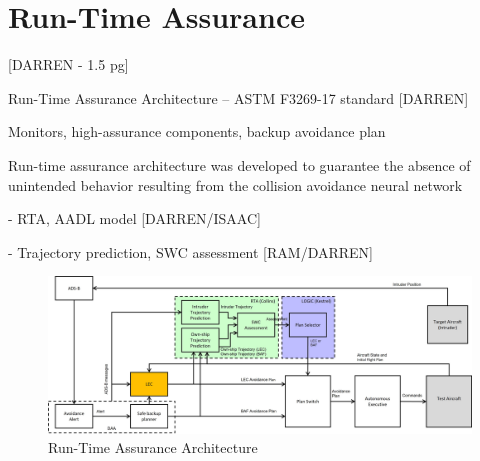 \section{Run-Time Assurance}

[DARREN - 1.5 pg]

Run-Time Assurance Architecture -- ASTM F3269-17 standard [DARREN]

Monitors, high-assurance components, backup avoidance plan

Run-time assurance architecture was developed to guarantee the absence of unintended behavior resulting from the collision avoidance neural network

- RTA, AADL model [DARREN/ISAAC]

- Trajectory prediction, SWC assessment [RAM/DARREN]


\begin{figure}
	\centering
	\includegraphics[width=\textwidth]{figures/rta-arch.jpg}
	\caption{Run-Time Assurance Architecture}
	\label{fig:rta-arch}
\end{figure}